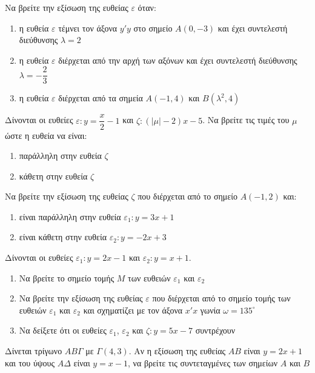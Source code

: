\documentclass{../../presentation}
\begin{document}
\begin{askisi}
  Να βρείτε την εξίσωση της ευθείας $ε$ όταν:
  \begin{enumerate}[<+->]
    \item η ευθεία $ε$ τέμνει τον άξονα $y'y$ στο σημείο $Α(0,-3)$ και έχει συντελεστή διεύθυνσης $λ=2$
    \item η ευθεία $ε$ διέρχεται από την αρχή των αξόνων και έχει συντελεστή διεύθυνσης $λ=-\dfrac{2}{3}$
    \item η ευθεία $ε$ διέρχεται από τα σημεία $Α(-1,4)$ και $Β(λ^2,4)$
  \end{enumerate}
\end{askisi}

\begin{askisi}
  Δίνονται οι ευθείες $ε:y=\dfrac{x}{2}-1$ και $ζ:(|μ|-2)x-5$. Να βρείτε τις τιμές του $μ$ ώστε η ευθεία να είναι:
  \begin{enumerate}[<+->]
    \item παράλληλη στην ευθεία $ζ$
    \item κάθετη στην ευθεία $ζ$
  \end{enumerate}
\end{askisi}

\begin{askisi}
  Να βρείτε την εξίσωση της ευθείας $ζ$ που διέρχεται από το σημείο $Α(-1,2)$ και:
  \begin{enumerate}[<+->]
    \item είναι παράλληλη στην ευθεία $ε_1:y=3x+1$
    \item είναι κάθετη στην ευθεία $ε_2:y=-2x+3$
  \end{enumerate}
\end{askisi}

\begin{askisi}
  Δίνονται οι ευθείες $ε_1:y=2x-1$ και $ε_2:y=x+1$.
  \begin{enumerate}[<+->]
    \item Να βρείτε το σημείο τομής $Μ$ των ευθειών $ε_1$ και $ε_2$
    \item Να βρείτε την εξίσωση της ευθείας $ε$ που διέρχεται από το σημείο τομής των ευθειών $ε_1$ και $ε_2$ και σχηματίζει με τον άξονα $x'x$ γωνία $ω=135^{\circ}$
    \item Να δείξετε ότι οι ευθείες $ε_1$, $ε_2$ και $ζ:y=5x-7$ συντρέχουν
  \end{enumerate}
\end{askisi}

\begin{askisi}
  Δίνεται τρίγωνο $ΑΒΓ$ με $Γ(4,3)$. Αν η εξίσωση της ευθείας $ΑΒ$ είναι $y=2x+1$ και του ύψους $ΑΔ$ είναι $y=x-1$, να βρείτε τις συντεταγμένες των σημείων $Α$ και $Β$
\end{askisi}
\end{document}
